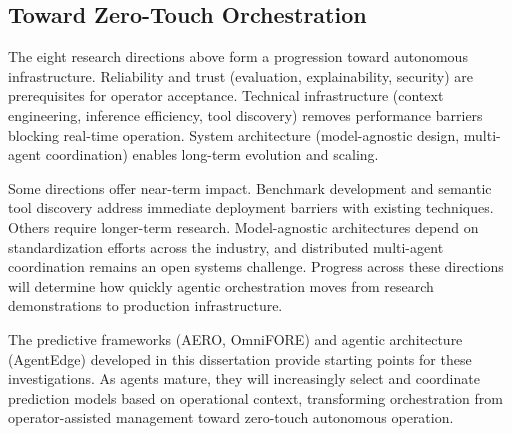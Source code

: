 \subsection{Toward Zero-Touch Orchestration}
\label{subsec:ch6_toward_zero_touch}

The eight research directions above form a progression toward autonomous infrastructure. Reliability and trust (evaluation, explainability, security) are prerequisites for operator acceptance. Technical infrastructure (context engineering, inference efficiency, tool discovery) removes performance barriers blocking real-time operation. System architecture (model-agnostic design, multi-agent coordination) enables long-term evolution and scaling.

Some directions offer near-term impact. Benchmark development and semantic tool discovery address immediate deployment barriers with existing techniques. Others require longer-term research. Model-agnostic architectures depend on standardization efforts across the industry, and distributed multi-agent coordination remains an open systems challenge. Progress across these directions will determine how quickly agentic orchestration moves from research demonstrations to production infrastructure.

The predictive frameworks (\ac{AERO}, \ac{OmniFORE}) and agentic architecture (\ac{AgentEdge}) developed in this dissertation provide starting points for these investigations. As agents mature, they will increasingly select and coordinate prediction models based on operational context, transforming orchestration from operator-assisted management toward zero-touch autonomous operation.
